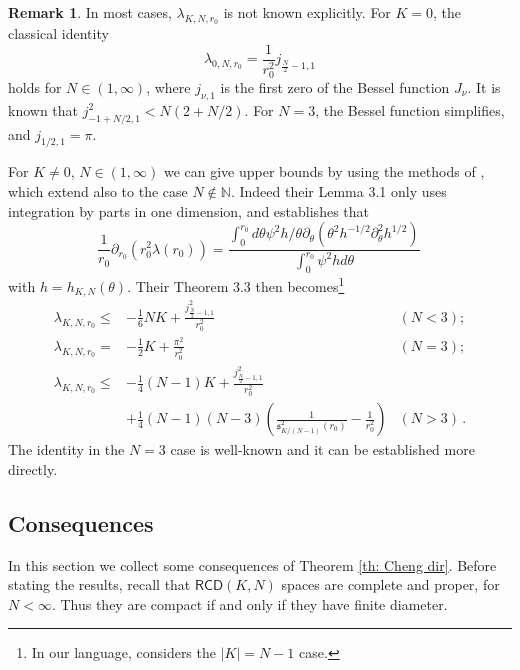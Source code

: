 \documentclass[12pt]{article}
\theoremstyle{plain}
\theoremstyle{definition}
\newtheorem{remark}[lemma]{Remark}
\begin{document}
\begin{remark}\label{rem: expl value}
In most cases, $\lambda_{K,N,r_0}$ is not known explicitly. For $K=0$, the classical identity
\begin{equation}
	\lambda_{0,N,r_0}= \frac1{r_0^2} j_{\frac N2-1,1}
\end{equation}
holds for $N\in (1,\infty)$, where $j_{\nu,1}$ is the first zero of the Bessel function $J_\nu$. It is known that $j_{-1+N/2,1}^2< N (2+N/2)$. For $N=3$, the Bessel function simplifies, and $j_{1/2,1}=\pi$.

For $K\neq0$, $N\in (1,\infty)$ we can give upper bounds by using the methods of \cite{borisov-freitas}, which extend also to the case $N\notin \mathbb{N}$. Indeed their Lemma 3.1 only uses integration by parts in one dimension, and establishes that
\begin{equation}
	\frac1{r_0} \partial_{r_0} (r_0^2 \lambda(r_0))= \frac{
	\int_0^{r_0} d \theta \psi^2 h/\theta \partial_\theta (\theta^2 h^{-1/2} \partial_\theta^2 h^{1/2})}{\int_0^{r_0} \psi^2 h d\theta}\,
\end{equation}
with $h=h_{K,N}(\theta)$. Their Theorem 3.3 then becomes\footnote{In our language, \cite{borisov-freitas} considers the $|K|=N-1$ case.}
\begin{subequations}
\begin{align}
	\lambda_{K,N,r_0} \leqslant & -\frac16 N K  + \frac {j_{\frac N2-1,1}^2}{r_0^2}
	\quad	&(N<3);\\
 \label{exp.bound N=3}
		\lambda_{K,N,r_0}  = & -\frac12 K  + \frac{\pi^2}{r_0^2}
		\quad &(N=3);\\
  \label{exp.bound N>3}
		\lambda_{K,N,r_0} \leqslant & -\frac14(N-1)K +  \frac{j_{\frac N2-1,1}^2 }{r_0^2}& \nonumber\\
		& +\frac14(N-1)(N-3)\left(\frac1{\mathfrak{s}^2_{K/(N-1)}(r_0)} - \frac1{r_0^2}\right)  &  (N>3)\,.
\end{align}
\end{subequations}
The identity in the $N=3$ case is well-known and it can be established more directly.
\end{remark}


\subsection{Consequences}\label{sec: consequence}
In this section we collect some consequences of Theorem \ref{th: Cheng dir}. Before stating the results, recall that $\mathsf{RCD}(K,N)$ spaces are complete and proper, for $N<\infty$. Thus they are compact if and only if they have finite diameter. 
\end{document}
